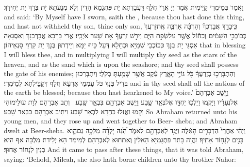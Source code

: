 {וַאֲמַר בְּמֵימְרִי קַיֵּימִית אֲמַר יְיָ אֲרֵי חֲלָף דַּעֲבַדְתָּא יָת פִּתְגָמָא הָדֵין וְלָא מְנַעְתָּא יָת בְּרָךְ יָת יְחִידָךְ׃}
{and said: ‘By Myself have I sworn, saith the \lord, because thou hast done this thing, and hast not withheld thy son, thine only son,}{}
{כִּֽי\maqqaf בָרֵ֣ךְ אֲבָרֶכְךָ֗ וְהַרְבָּ֨ה אַרְבֶּ֤ה אֶֽת\maqqaf זַרְעֲךָ֙ כְּכוֹכְבֵ֣י הַשָּׁמַ֔יִם וְכַח֕וֹל אֲשֶׁ֖ר עַל\maqqaf שְׂפַ֣ת הַיָּ֑ם וְיִרַ֣שׁ זַרְעֲךָ֔ אֵ֖ת שַׁ֥עַר אֹיְבָֽיו׃}
{אֲרֵי בָּרָכָא אֲבָרְכִנָּךְ וְאַסְגָּאָה אַסְגֵּי יָת בְּנָךְ כְּכוֹכְבֵי שְׁמַיָּא וּכְחָלָא דְּעַל כֵּיף יַמָּא וְיֵירְתוּן בְּנָךְ יָת קִרְוֵי סָנְאֵיהוֹן׃}
{that in blessing I will bless thee, and in multiplying I will multiply thy seed as the stars of the heaven, and as the sand which is upon the seashore; and thy seed shall possess the gate of his enemies;}{}
{וְהִתְבָּרְכ֣וּ בְזַרְעֲךָ֔ כֹּ֖ל גּוֹיֵ֣י הָאָ֑רֶץ עֵ֕קֶב אֲשֶׁ֥ר שָׁמַ֖עְתָּ בְּקֹלִֽי׃}
{וְיִתְבָּרְכוּן בְּדִיל בְּנָךְ כֹּל עַמְמֵי אַרְעָא חֲלָף דְּקַבֵּילְתָּא לְמֵימְרִי׃}
{and in thy seed shall all the nations of the earth be blessed; because thou hast hearkened to My voice.’}{}
{וַיָּ֤שׇׁב אַבְרָהָם֙ אֶל\maqqaf נְעָרָ֔יו וַיָּקֻ֛מוּ וַיֵּלְכ֥וּ יַחְדָּ֖ו אֶל\maqqaf בְּאֵ֣ר שָׁ֑בַע וַיֵּ֥שֶׁב אַבְרָהָ֖ם בִּבְאֵ֥ר שָֽׁבַע׃ \petucha }
{וְתָב אַבְרָהָם לְוָת עוּלֵימוֹהִי וְקָמוּ וַאֲזַלוּ כַּחְדָּא לִבְאֵר שָׁבַע וִיתֵיב אַבְרָהָם בִּבְאֵר שָׁבַע׃}
{So Abraham returned unto his young men, and they rose up and went together to Beer- sheba; and Abraham dwelt at Beer-sheba.}{}
{וַיְהִ֗י אַחֲרֵי֙ הַדְּבָרִ֣ים הָאֵ֔לֶּה וַיֻּגַּ֥ד לְאַבְרָהָ֖ם לֵאמֹ֑ר הִ֠נֵּ֠ה יָלְדָ֨ה מִלְכָּ֥ה גַם\maqqaf הִ֛וא בָּנִ֖ים לְנָח֥וֹר אָחִֽיךָ׃}
{וַהֲוָה בָּתַר פִּתְגָמַיָּא הָאִלֵּין וְאִתְחַוַּא לְאַבְרָהָם לְמֵימַר הָא יְלֵידַת מִלְכָּה אַף הִיא בְּנִין לְנָחוֹר אֲחוּךְ׃}
{And it came to pass after these things, that it was told Abraham, saying: ‘Behold, Milcah, she also hath borne children unto thy brother Nahor:}{}
